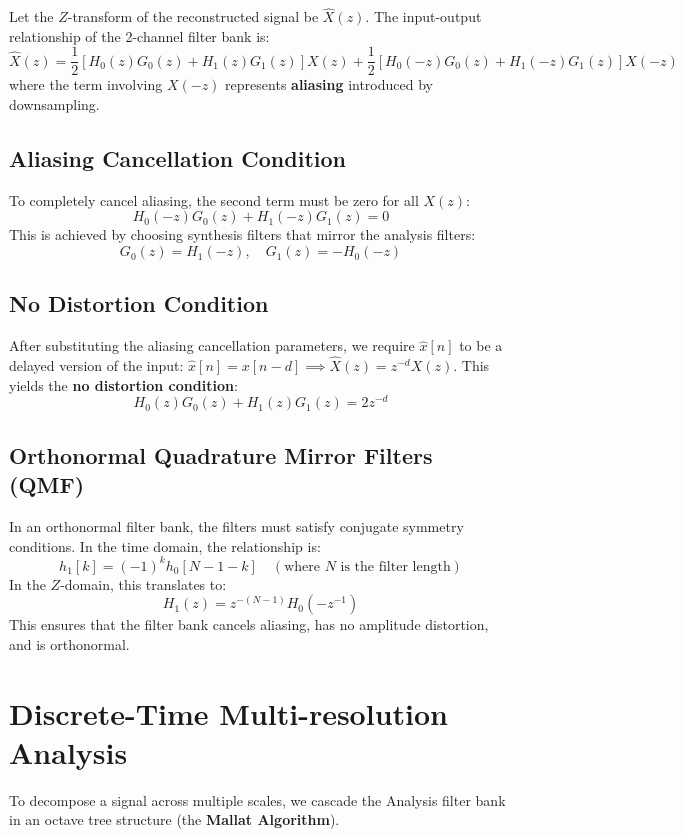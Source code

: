 \documentclass[12pt,a4paper]{article}
\begin{document}
Let the $Z$-transform of the reconstructed signal be $\hat{X}(z)$. The input-output relationship of the 2-channel filter bank is:
$$\hat{X}(z) = \frac{1}{2}\left[H_0(z)G_0(z) + H_1(z)G_1(z)\right]X(z) + \frac{1}{2}\left[H_0(-z)G_0(z) + H_1(-z)G_1(z)\right]X(-z)$$
where the term involving $X(-z)$ represents \textbf{aliasing} introduced by downsampling.

\subsection{Aliasing Cancellation Condition}
To completely cancel aliasing, the second term must be zero for all $X(z)$:
$$H_0(-z)G_0(z) + H_1(-z)G_1(z) = 0$$
This is achieved by choosing synthesis filters that mirror the analysis filters:
$$G_0(z) = H_1(-z), \quad G_1(z) = -H_0(-z)$$

\subsection{No Distortion Condition}
After substituting the aliasing cancellation parameters, we require $\hat{x}[n]$ to be a delayed version of the input: $\hat{x}[n] = x[n - d] \implies \hat{X}(z) = z^{-d}X(z)$. This yields the \textbf{no distortion condition}:
$$H_0(z)G_0(z) + H_1(z)G_1(z) = 2z^{-d}$$

\subsection{Orthonormal Quadrature Mirror Filters (QMF)}
In an orthonormal filter bank, the filters must satisfy conjugate symmetry conditions. In the time domain, the relationship is:
$$h_1[k] = (-1)^k h_0[N - 1 - k] \quad (\text{where } N \text{ is the filter length})$$
In the $Z$-domain, this translates to:
$$H_1(z) = z^{-(N-1)}H_0(-z^{-1})$$
This ensures that the filter bank cancels aliasing, has no amplitude distortion, and is orthonormal.

\section{Discrete-Time Multi-resolution Analysis}

To decompose a signal across multiple scales, we cascade the Analysis filter bank in an octave tree structure (the \textbf{Mallat Algorithm}).
\end{document}
